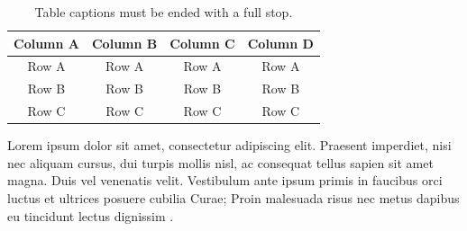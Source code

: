 \begin{table}
{\setlength{\tabcolsep}{14pt}
\caption{Table captions must be ended with a full stop.}
\begin{center}
\vspace{-6mm}
\begin{tabular}{cccc}
\hline\hline
Column A & Column B & Column C & Column D \\
\hline
Row A & Row A & Row A & Row A \\
Row B & Row B & Row B & Row B \\
Row C & Row C & Row C & Row C \\
\hline
\end{tabular}
\vspace{-6mm}
\end{center}
\label{sitable3}}
\end{table}

Lorem ipsum dolor sit amet, consectetur adipiscing elit. Praesent imperdiet, nisi 
nec aliquam cursus, dui turpis mollis nisl, ac consequat tellus sapien sit amet 
magna. Duis vel venenatis velit. Vestibulum ante ipsum primis in faucibus orci 
luctus et ultrices posuere cubilia Curae; Proin malesuada risus nec metus dapibus 
eu tincidunt lectus dignissim \cite{1993JHyd..144..193B}.


